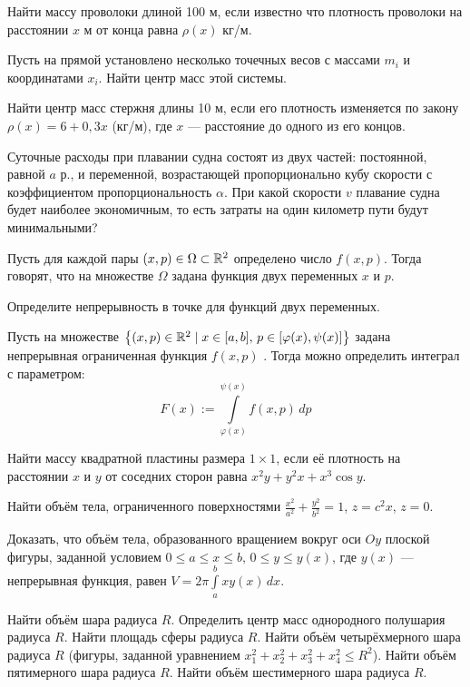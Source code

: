 \documentclass[12pt]{article}
\begin{document}
 Найти массу проволоки длиной 100 м, если известно что плотность проволоки на расстоянии $x$ м от конца равна $\rho(x)$ кг/м.

 Пусть на прямой установлено несколько точечных весов с массами $m_i$ и координатами $x_i$. Найти центр масс этой системы.

 Найти центр масс стержня длины 10 м, если его плотность изменяется по закону $\rho(x) = 6 + 0,3x$ (кг/м), где $x$ --- расстояние до одного из его
концов.

 Суточные расходы при плавании судна состоят из двух частей: постоянной, равной $a$ р., и переменной, возрастающей пропорционально кубу скорости с
коэффициентом пропорциональность $\alpha$. При какой скорости $v$ плавание судна будет наиболее экономичным, то есть затраты на один километр пути будут
минимальными?


 Пусть для каждой пары $(x,p) \in \Omega \subset \mathbb{R}^2$ определено число $f(x,p)$. Тогда говорят, что на множестве $\Omega$ задана функция двух
переменных $x$ и $p$.

 Определите непрерывность в точке для функций двух переменных.


\newpage





 Пусть на множестве $\left\{ (x,p)\in \mathbb{R}^2 \mid x\in[a,b],\, p \in [\varphi(x), \psi(x)] \right\}$ задана  непрерывная ограниченная функция $f(x,p)$
. Тогда можно определить интеграл с параметром:
$$F(x) := \int\limits_{\varphi(x)}^{\psi(x)} f(x,p)\, dp$$
\vspace*{-3mm}



Найти массу квадратной пластины размера $1\times 1$, если её плотность на расстоянии $x$ и $y$ от соседних сторон равна $x^2y + y^2x + x^3\cos y$.

Найти объём тела, ограниченного поверхностями $\frac{x^2}{a^2} + \frac{y^2}{b^2} = 1$, $z = c^2x$, $z = 0$.


Доказать, что объём тела, образованного вращением вокруг оси $Oy$ плоской фигуры, заданной условием $0 \leqslant a \leqslant x \leqslant b,\, 0\leqslant y \leqslant y(x)$, где $y(x)$
--- непрерывная функция, равен $V = 2 \pi \int\limits_a^b x y(x) \, dx$.

 Найти объём шара радиуса $R$.
 Определить центр масс однородного полушария радиуса $R$.
 Найти площадь сферы радиуса $R$.
 Найти объём четырёхмерного шара радиуса $R$ (фигуры, заданной уравнением $x_1^2 + x_2^2 + x_3^2 + x_4^2 \leqslant R^2$).
 Найти объём пятимерного шара радиуса $R$.
 Найти объём шестимерного шара радиуса $R$.
\end{document}

